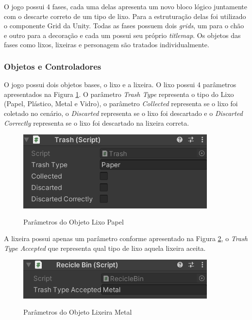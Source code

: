     O jogo possui 4 fases, cada uma delas apresenta um novo bloco lógico juntamente com o descarte correto de um tipo de lixo. Para a estruturação delas foi utilizado o componente Grid da Unity. Todas as fases possuem dois \textit{grids}, um para o chão e outro para a decoração e cada um possui seu próprio \textit{titlemap}. Os objetos das fases como lixos, lixeiras e personagem são tratados individualmente.
    
    \subsubsection{Objetos e Controladores}
    
    O jogo possui dois objetos bases, o lixo e a lixeira. O lixo possui 4 parâmetros apresentados na Figura \ref{figura:parametros_lixo}. O parâmetro \textit{Trash Type} representa o tipo do Lixo (Papel, Plástico, Metal e Vidro), o parâmetro \textit{Collected} representa se o lixo foi coletado no cenário, o \textit{Discarted} representa se o lixo foi descartado e o \textit{Discarted Correctly} representa se o lixo foi descartado na lixeira correta. 
    
    \begin{figure}[H]
        \caption{Parâmetros do Objeto Lixo Papel}
        \centering
        \includegraphics[width=10cm]{Imagens/Cap4/parametros_lixo.png}
        \label{figura:parametros_lixo}
    \end{figure}
    
    A lixeira possui apenas um parâmetro conforme apresentado na Figura \ref{figura:parametro_lixeira}, o \textit{Trash Type Accepted} que representa qual tipo de lixo aquela lixeira aceita.
    
    \begin{figure}[H]
        \caption{Parâmetros do Objeto Lixeira Metal}
        \centering
        \includegraphics[width=10cm]{Imagens/Cap4/parametro_lixeira.png}
        \label{figura:parametro_lixeira}
    \end{figure}
    
